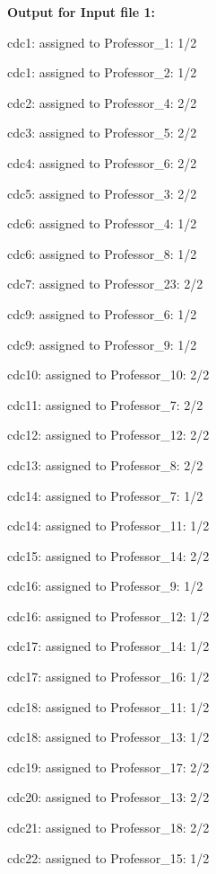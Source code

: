 \documentclass{article} %
\begin{document}


\noindent \textbf{Output for Input file 1:}

\noindent cdc1: assigned to Professor\_1: 1/2

\noindent cdc1: assigned to Professor\_2: 1/2

\noindent cdc2: assigned to Professor\_4: 2/2

\noindent cdc3: assigned to Professor\_5: 2/2

\noindent cdc4: assigned to Professor\_6: 2/2

\noindent cdc5: assigned to Professor\_3: 2/2

\noindent cdc6: assigned to Professor\_4: 1/2

\noindent cdc6: assigned to Professor\_8: 1/2

\noindent cdc7: assigned to Professor\_23: 2/2

\noindent cdc9: assigned to Professor\_6: 1/2

\noindent cdc9: assigned to Professor\_9: 1/2

\noindent cdc10: assigned to Professor\_10: 2/2

\noindent cdc11: assigned to Professor\_7: 2/2

\noindent cdc12: assigned to Professor\_12: 2/2

\noindent cdc13: assigned to Professor\_8: 2/2

\noindent cdc14: assigned to Professor\_7: 1/2

\noindent cdc14: assigned to Professor\_11: 1/2

\noindent cdc15: assigned to Professor\_14: 2/2

\noindent cdc16: assigned to Professor\_9: 1/2

\noindent cdc16: assigned to Professor\_12: 1/2

\noindent cdc17: assigned to Professor\_14: 1/2

\noindent cdc17: assigned to Professor\_16: 1/2

\noindent cdc18: assigned to Professor\_11: 1/2

\noindent cdc18: assigned to Professor\_13: 1/2

\noindent cdc19: assigned to Professor\_17: 2/2

\noindent cdc20: assigned to Professor\_13: 2/2

\noindent cdc21: assigned to Professor\_18: 2/2

\noindent cdc22: assigned to Professor\_15: 1/2
\end{document}
